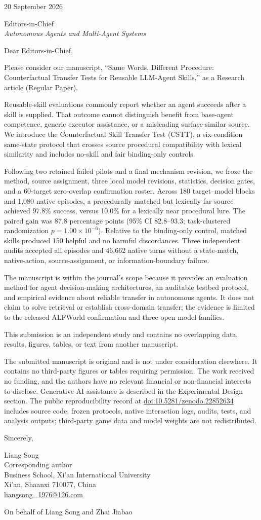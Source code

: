 \documentclass[11pt]{article}
\begin{document}
20 September 2026

Editors-in-Chief\\
\emph{Autonomous Agents and Multi-Agent Systems}

Dear Editors-in-Chief,

Please consider our manuscript, ``Same Words, Different Procedure:
Counterfactual Transfer Tests for Reusable LLM-Agent Skills,'' as a Research
article (Regular Paper).

Reusable-skill evaluations commonly report whether an agent succeeds after a
skill is supplied. That outcome cannot distinguish benefit from base-agent
competence, generic executor assistance, or a misleading surface-similar source.
We introduce the Counterfactual Skill Transfer Test (CSTT), a six-condition
same-state protocol that crosses source procedural compatibility with lexical
similarity and includes no-skill and fair binding-only controls.

Following two retained failed pilots and a final mechanism revision, we froze
the method, source assignment, three local model revisions, statistics,
decision gates, and a 60-target zero-overlap confirmation roster. Across 180
target--model blocks and 1,080 native episodes, a procedurally matched but
lexically far source achieved 97.8\% success, versus 10.0\% for a lexically near
procedural lure. The paired gain was 87.8 percentage points (95\% CI
82.8--93.3; task-clustered randomization $p=1.00\times10^{-6}$). Relative to
the binding-only control, matched skills produced 150 helpful and no harmful
discordances. Three independent audits accepted all episodes and 46,662 native
turns without a state-match, native-action, source-assignment, or
information-boundary failure.

The manuscript is within the journal's scope because it provides an evaluation
method for agent decision-making architectures, an auditable testbed protocol,
and empirical evidence about reliable transfer in autonomous agents. It does
not claim to solve retrieval or establish cross-domain transfer; the evidence
is limited to the released ALFWorld confirmation and three open model families.

This submission is an independent study and contains no overlapping data,
results, figures, tables, or text from another manuscript.

The submitted manuscript is original and is not under consideration elsewhere.
It contains no third-party figures or tables requiring permission. The work
received no funding, and the authors have no relevant financial or
non-financial interests to disclose. Generative-AI assistance is described in
the Experimental Design section. The public reproducibility record at
\href{https://doi.org/10.5281/zenodo.22852634}{doi:10.5281/zenodo.22852634}
includes source code, frozen protocols, native interaction logs, audits, tests,
and analysis outputs; third-party game data and model weights are not
redistributed.

Sincerely,

Liang Song\\
Corresponding author\\
Business School, Xi'an International University\\
Xi'an, Shaanxi 710077, China\\
\href{mailto:liangsong_1976@126.com}{liangsong\_1976@126.com}

On behalf of Liang Song and Zhai Jiabao
\end{document}

